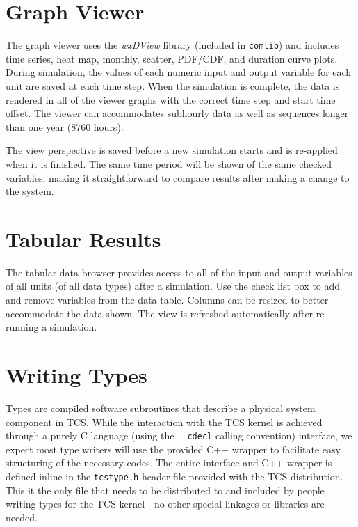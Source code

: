 \documentclass{article}
\begin{document}
\section{Graph Viewer}

The graph viewer uses the \emph{wxDView} library (included in \texttt{comlib}) and includes time series, heat map, monthly, scatter, PDF/CDF, and duration curve plots.  During simulation, the values of each numeric input and output variable for each unit are saved at each time step.  When the simulation is complete, the data is rendered in all of the viewer graphs with the correct time step and start time offset.  The viewer can accommodates subhourly data as well as sequences longer than one year (8760 hours).  

The view perspective is saved before a new simulation starts and is re-applied when it is finished.  The same time period will be shown of the same checked variables, making it straightforward to compare results after making a change to the system.

\section{Tabular Results}

The tabular data browser provides access to all of the input and output variables of all units (of all data types) after a simulation.  Use the check list box to add and remove variables from the data table.  Columns can be resized to better accommodate the data shown.  The view is refreshed automatically after re-running a simulation.


\section{Writing Types}\label{sec_types}

Types are compiled software subroutines that describe a physical system component in TCS.  While the interaction with the TCS kernel is achieved through a purely C language (using the \texttt{\_\_cdecl} calling convention) interface, we expect most type writers will use the provided C++ wrapper to facilitate easy structuring of the necessary codes.  The entire interface and C++ wrapper is defined inline in the \texttt{tcstype.h} header file provided with the TCS distribution.  This it the only file that needs to be distributed to and included by people writing types for the TCS kernel - no other special linkages or libraries are needed.
\end{document}
